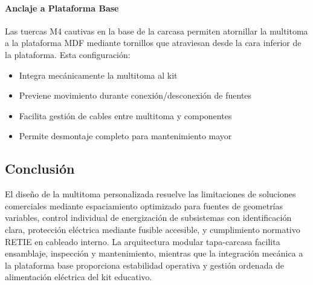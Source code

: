 \paragraph{Anclaje a Plataforma Base}

Las tuercas M4 cautivas en la base de la carcasa permiten atornillar la multitoma a la plataforma MDF mediante tornillos que atraviesan desde la cara inferior de la plataforma. Esta configuración:
\begin{itemize}
    \item Integra mecánicamente la multitoma al kit
    \item Previene movimiento durante conexión/desconexión de fuentes
    \item Facilita gestión de cables entre multitoma y componentes
    \item Permite desmontaje completo para mantenimiento mayor
\end{itemize}

\subsection{Conclusión}

El diseño de la multitoma personalizada resuelve las limitaciones de soluciones comerciales mediante espaciamiento optimizado para fuentes de geometrías variables, control individual de energización de subsistemas con identificación clara, protección eléctrica mediante fusible accesible, y cumplimiento normativo RETIE en cableado interno. La arquitectura modular tapa-carcasa facilita ensamblaje, inspección y mantenimiento, mientras que la integración mecánica a la plataforma base proporciona estabilidad operativa y gestión ordenada de alimentación eléctrica del kit educativo.